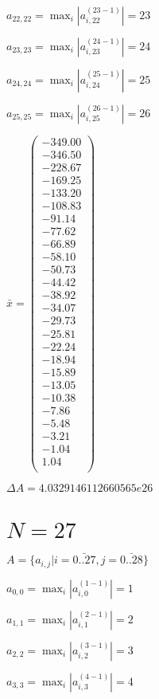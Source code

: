 \documentclass[a4paper,12pt]{article}
\begin{document}
$a _{ 22, 22 } =  \max _i |a _{ i, 22 } ^{ (23 - 1) } | = 23$

$a _{ 23, 23 } =  \max _i |a _{ i, 23 } ^{ (24 - 1) } | = 24$

$a _{ 24, 24 } =  \max _i |a _{ i, 24 } ^{ (25 - 1) } | = 25$

$a _{ 25, 25 } =  \max _i |a _{ i, 25 } ^{ (26 - 1) } | = 26$

$\bar { x } = \begin{pmatrix}
-349.00 \\
-346.50 \\
-228.67 \\
-169.25 \\
-133.20 \\
-108.83 \\
-91.14 \\
-77.62 \\
-66.89 \\
-58.10 \\
-50.73 \\
-44.42 \\
-38.92 \\
-34.07 \\
-29.73 \\
-25.81 \\
-22.24 \\
-18.94 \\
-15.89 \\
-13.05 \\
-10.38 \\
-7.86 \\
-5.48 \\
-3.21 \\
-1.04 \\
1.04 \\
\end{pmatrix}
$

$\Delta A = 4.0329146112660565e26$



\section{ $N = 27$ }
$A = \{ a _{ i, j } | i = \bar { 0..27 }, j = \bar { 0..28 } \}$

$a _{ 0, 0 } =  \max _i |a _{ i, 0 } ^{ (1 - 1) } | = 1$

$a _{ 1, 1 } =  \max _i |a _{ i, 1 } ^{ (2 - 1) } | = 2$

$a _{ 2, 2 } =  \max _i |a _{ i, 2 } ^{ (3 - 1) } | = 3$

$a _{ 3, 3 } =  \max _i |a _{ i, 3 } ^{ (4 - 1) } | = 4$
\end{document}

